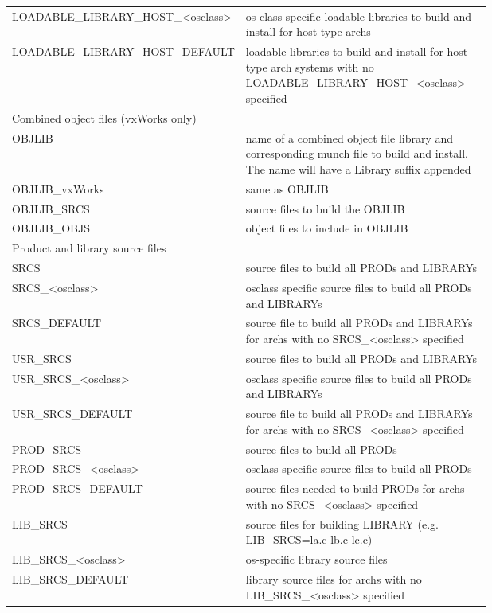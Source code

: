 \begin{center}
\begin{longtable}{lp{0.7\linewidth}}
LOADABLE\_LIBRARY\_HOST\_\textless{}osclass\textgreater{} & os class specific loadable libraries to build and install for host type archs\\
LOADABLE\_LIBRARY\_HOST\_DEFAULT & loadable libraries to build and install for host type arch systems with no LOADABLE\_LIBRARY\_HOST\_\textless{}osclass\textgreater{} specified\\
Combined object files (vxWorks only) & \\
OBJLIB & name of a combined object file library and corresponding munch file to build and install. The name will have a Library suffix appended\\
OBJLIB\_vxWorks & same as OBJLIB\\
OBJLIB\_SRCS & source files to build the OBJLIB\\
OBJLIB\_OBJS & object files to include in OBJLIB\\
Product and library source files & \\
SRCS & source files to build all PRODs and LIBRARYs\\
SRCS\_\textless{}osclass\textgreater{} & osclass specific source files to build all PRODs and LIBRARYs\\
SRCS\_DEFAULT & source file to build all PRODs and LIBRARYs for archs with no SRCS\_\textless{}osclass\textgreater{} specified\\
USR\_SRCS & source files to build all PRODs and LIBRARYs\\
USR\_SRCS\_\textless{}osclass\textgreater{} & osclass specific source files to build all PRODs and LIBRARYs\\
USR\_SRCS\_DEFAULT & source file to build all PRODs and LIBRARYs for archs with no SRCS\_\textless{}osclass\textgreater{} specified\\
PROD\_SRCS & source files to build all PRODs\\
PROD\_SRCS\_\textless{}osclass\textgreater{} & osclass specific source files to build all PRODs\\
PROD\_SRCS\_DEFAULT & source files needed to build PRODs for archs with no SRCS\_\textless{}osclass\textgreater{} specified\\
LIB\_SRCS & source files for building LIBRARY (e.g. LIB\_SRCS=la.c lb.c lc.c)\\
LIB\_SRCS\_\textless{}osclass\textgreater{} & os-specific library source files\\
LIB\_SRCS\_DEFAULT & library source files for archs with no LIB\_SRCS\_\textless{}osclass\textgreater{} specified\\

\end{longtable}
\end{center}
